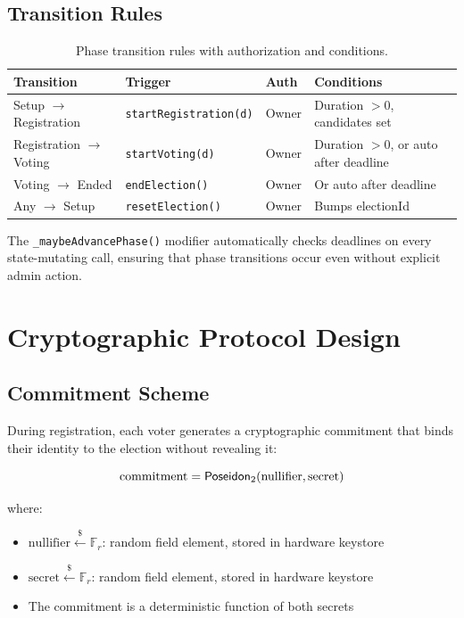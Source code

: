 \subsection{Transition Rules}

\begin{table}[H]
\centering
\caption{Phase transition rules with authorization and conditions.}
\label{tab:transitions}
\begin{tabular}{|l|l|l|p{5cm}|}
\hline
\textbf{Transition} & \textbf{Trigger} & \textbf{Auth} & \textbf{Conditions} \\
\hline
Setup $\to$ Registration & \texttt{startRegistration(d)} & Owner & Duration $> 0$, candidates set \\
\hline
Registration $\to$ Voting & \texttt{startVoting(d)} & Owner & Duration $> 0$, or auto after deadline \\
\hline
Voting $\to$ Ended & \texttt{endElection()} & Owner & Or auto after deadline \\
\hline
Any $\to$ Setup & \texttt{resetElection()} & Owner & Bumps electionId \\
\hline
\end{tabular}
\end{table}

The \texttt{\_maybeAdvancePhase()} modifier automatically checks deadlines on every state-mutating call, ensuring that phase transitions occur even without explicit admin action.

\section{Cryptographic Protocol Design}

\subsection{Commitment Scheme}

During registration, each voter generates a cryptographic commitment that binds their identity to the election without revealing it:

\begin{equation}
\text{commitment} = \mathsf{Poseidon}_2(\text{nullifier}, \text{secret})
\end{equation}

where:
\begin{itemize}
    \item $\text{nullifier} \xleftarrow{\$} \mathbb{F}_r$: random field element, stored in hardware keystore
    \item $\text{secret} \xleftarrow{\$} \mathbb{F}_r$: random field element, stored in hardware keystore
    \item The commitment is a deterministic function of both secrets
\end{itemize}

